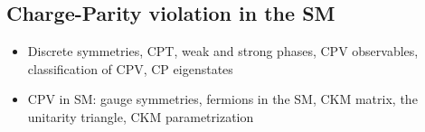\subsection{Charge-Parity violation in the SM}
\begin{itemize}
  \item Discrete symmetries, CPT, weak and strong phases, CPV observables, classification of CPV, CP eigenstates
  \item CPV in SM: gauge symmetries, fermions in the SM, CKM matrix, the unitarity triangle, CKM parametrization
\end{itemize}


